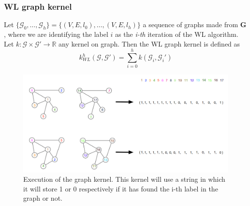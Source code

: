 \subsubsection{WL graph kernel}
Let
$\{\mathcal{G}_{0}, \dots, \mathcal{G}_{h}\} = \{ (V, E, l_{0}), \dots, (V, E , l
_{h}) \}$
a sequence of graphs made from $\mathbf{G}$, where we are identifying the label $i$
as the \textit{i-th} iteration of the WL algorithm. Let $k : \mathcal{G}\times \mathcal{G}
' \rightarrow \mathbb{R}$ any kernel on graph. Then the WL graph kernel is
defined as
\[
	k_{WL}^{h}(\mathcal{G}, \mathcal{G}') = \sum_{i=0}^{h}k(\mathcal{G}_{i}, \mathcal{G}
	_{i}')
\]

\begin{figure}[H]
	\centering
	\includegraphics[scale=0.5]{
        images/15_KernelMachines_graphKernel.png
    }
	\caption{Execution of the graph kernel. This kernel will use a string in which
	it will store 1 or 0 respectively if it has found the i-th label in the graph or
	not. }
	\label{fig:ML_kernel}
\end{figure}